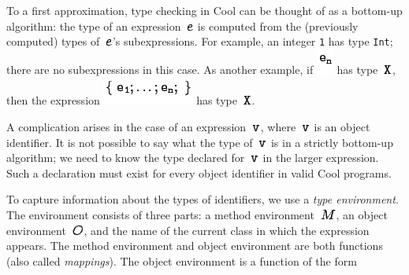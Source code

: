 \documentclass[]{article}
\begin{document}
To a first approximation, type checking in Cool can be thought of as a
bottom-up algorithm: the type of an expression
\includegraphics{img51.png} is computed from the (previously computed)
types of \includegraphics{img51.png}'s subexpressions. For example, an
integer \texttt{1} has type \texttt{Int}; there are no subexpressions in
this case. As another example, if \includegraphics{img18.png} has type
\includegraphics{img52.png}, then the expression
\includegraphics{img53.png} has type \includegraphics{img52.png}.

A complication arises in the case of an expression
\includegraphics{img54.png}, where \includegraphics{img54.png} is an
object identifier. It is not possible to say what the type of
\includegraphics{img54.png} is in a strictly bottom-up algorithm; we
need to know the type declared for \includegraphics{img54.png} in the
larger expression. Such a declaration must exist for every object
identifier in valid Cool programs.

To capture information about the types of identifiers, we use a
\emph{type environment}. The environment consists of three parts: a
method environment \includegraphics{img55.png}, an object environment
\includegraphics{img56.png}, and the name of the current class in which
the expression appears. The method environment and object environment
are both functions (also called \emph{mappings}). The object environment
is a function of the form \\
\end{document}
